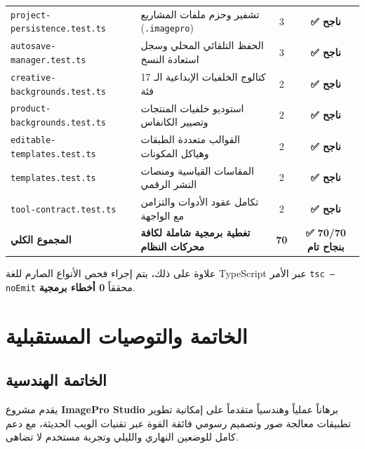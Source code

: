 \documentclass[12pt,a4paper]{report}
\begin{document}
\begin{table}[htbp]
\begin{tabularx}{\textwidth}{l X c c}
        \texttt{project-persistence.test.ts} & تشفير وحزم ملفات المشاريع (\texttt{.imagepro}) & 3 & \textcolor{StudioGreen}{\textbf{✅ ناجح}} \\
        \texttt{autosave-manager.test.ts} & الحفظ التلقائي المحلي وسجل استعادة النسخ & 3 & \textcolor{StudioGreen}{\textbf{✅ ناجح}} \\
        \texttt{creative-backgrounds.test.ts} & كتالوج الخلفيات الإبداعية الـ 17 فئة & 2 & \textcolor{StudioGreen}{\textbf{✅ ناجح}} \\
        \texttt{product-backgrounds.test.ts} & استوديو خلفيات المنتجات وتصيير الكانفاس & 2 & \textcolor{StudioGreen}{\textbf{✅ ناجح}} \\
        \texttt{editable-templates.test.ts} & القوالب متعددة الطبقات وهياكل المكونات & 2 & \textcolor{StudioGreen}{\textbf{✅ ناجح}} \\
        \texttt{templates.test.ts} & المقاسات القياسية ومنصات النشر الرقمي & 2 & \textcolor{StudioGreen}{\textbf{✅ ناجح}} \\
        \texttt{tool-contract.test.ts} & تكامل عقود الأدوات والتزامن مع الواجهة & 2 & \textcolor{StudioGreen}{\textbf{✅ ناجح}} \\
        \midrule
        \textbf{المجموع الكلي} & \textbf{تغطية برمجية شاملة لكافة محركات النظام} & \textbf{70} & \textcolor{StudioGreen}{\textbf{✅ 70/70 بنجاح تام}} \\
        \bottomrule
    \end{tabularx}
\end{table}

علاوة على ذلك، يتم إجراء فحص الأنواع الصارم للغة TypeScript عبر الأمر \texttt{tsc --noEmit} محققاً \textbf{0 أخطاء برمجية}.

\chapter{الخاتمة والتوصيات المستقبلية}

\section{الخاتمة الهندسية}
يقدم مشروع \textbf{ImagePro Studio} برهاناً عملياً وهندسياً متقدماً على إمكانية تطوير تطبيقات معالجة صور وتصميم رسومي فائقة القوة عبر تقنيات الويب الحديثة، مع دعم كامل للوضعين النهاري والليلي وتجربة مستخدم لا تضاهى.
\end{document}
